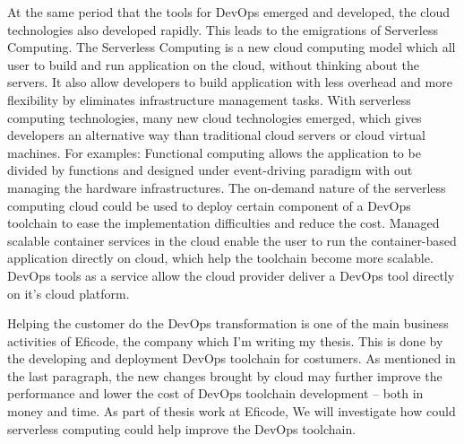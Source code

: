 \par
At the same period that the tools for DevOps emerged and developed, the cloud technologies also developed rapidly. This leads to the emigrations of Serverless Computing.  
The Serverless Computing is a new cloud computing model which all user to build and run application on the cloud, without thinking about the servers.\cite{Serverle81:online} It also allow developers to build application with less overhead and more flexibility by eliminates infrastructure management tasks.\cite{Serverle81:online}\cite{Serverle73:online}
With serverless computing technologies, many new cloud technologies emerged, which gives developers an alternative way than traditional cloud servers or cloud virtual machines. For examples: Functional computing allows the application to be divided by functions and designed under event-driving paradigm with out managing the hardware infrastructures. The on-demand nature of the serverless computing cloud could be used to deploy certain component of a DevOps toolchain to ease the implementation difficulties and reduce the cost. Managed scalable container services in the cloud enable the user to run the container-based application directly on cloud, which help the toolchain become more scalable. DevOps tools as a service allow the cloud provider deliver a DevOps tool directly on it's cloud platform.\cite{DevOpsas45:online}
\par
Helping the customer do the DevOps transformation is one of the main business activities of Eficode, the company which I'm writing my thesis. This is done by the developing and deployment DevOps toolchain for costumers. As mentioned in the last paragraph, the new changes brought by cloud may further improve the performance and lower the cost of DevOps toolchain development -- both in money and time. As part of thesis work at Eficode, We will investigate how could serverless computing could help improve the DevOps toolchain. 

